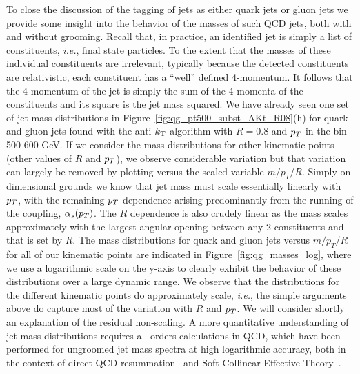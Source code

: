 To close the discussion of the tagging of jets as either quark jets or gluon jets we provide some insight into the behavior of the masses of such QCD jets,
both with and without grooming.  Recall that, in practice, an
identified jet is simply a list of constituents, \textit{i.e.}, final
state particles.  To the extent
that the masses of these individual constituents are irrelevant, typically because the detected constituents are relativistic, each constituent has a ``well''
defined 4-momentum.  It follows that the 4-momentum of the jet  is simply the sum of the 4-momenta of the constituents and its square is the jet mass squared.
We have already seen one set of jet mass distributions in  Figure~\ref{fig:qg_pt500_subst_AKt_R08}(h) for quark and gluon jets found with the anti-$k_{\mathrm{T}}$
algorithm with  $R = 0.8$ and $p_T$ in the bin 500-600 GeV.  If we consider the mass distributions for other kinematic points (other values of $R$ and $p_T$),
we observe considerable variation but that variation can largely be removed by plotting versus the scaled variable $m/p_T/R$.  Simply on dimensional grounds
we know that jet mass must scale essentially linearly with $p_T$, with the remaining $p_T$ dependence arising predominantly from the running of the coupling,
$\alpha_s(p_T)$.  The $R$ dependence is also crudely linear as the mass scales approximately with the largest angular opening between any 2 constituents
and that is set by $R$.  The mass distributions for quark and gluon jets versus $m/p_T/R$ for all of our kinematic points 
are indicated in Figure~\ref{fig:qg_masses_log}, where
we use a logarithmic scale on the y-axis to clearly exhibit the behavior of these distributions over a large dynamic range.  We observe that the distributions
for the different kinematic points do approximately scale, \textit{i.e.}, the simple arguments above do capture most of the variation with $R$ and $p_T$.
We will consider shortly an explanation of the residual non-scaling. A more quantitative understanding of jet mass distributions requires all-orders calculations in QCD, which have been performed for ungroomed jet mass spectra at high logarithmic accuracy, both in the context of direct QCD resummation~\cite{Li:2012bw,Dasgupta:2012hg} and Soft Collinear Effective Theory~\cite{Chien:2012ur,Jouttenus:2013hs}. 

